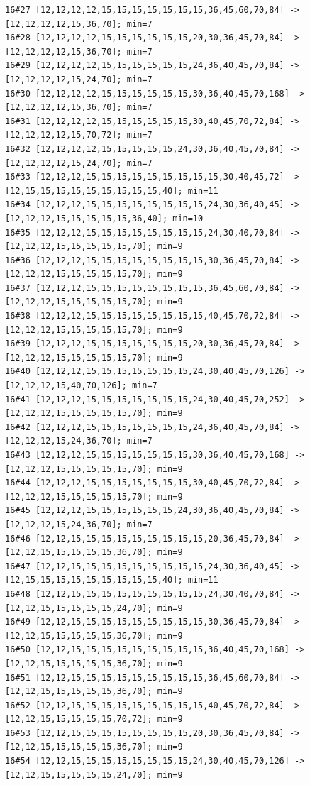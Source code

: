 \documentclass[11pt,a4paper]{article}
\begin{document}
\begin{Verbatim}[breaklines,breakanywhere,fontsize=\footnotesize]
16#27 [12,12,12,12,15,15,15,15,15,15,15,36,45,60,70,84] -> [12,12,12,12,15,36,70]; min=7
16#28 [12,12,12,12,15,15,15,15,15,15,20,30,36,45,70,84] -> [12,12,12,12,15,36,70]; min=7
16#29 [12,12,12,12,15,15,15,15,15,15,24,36,40,45,70,84] -> [12,12,12,12,15,24,70]; min=7
16#30 [12,12,12,12,15,15,15,15,15,15,30,36,40,45,70,168] -> [12,12,12,12,15,36,70]; min=7
16#31 [12,12,12,12,15,15,15,15,15,15,30,40,45,70,72,84] -> [12,12,12,12,15,70,72]; min=7
16#32 [12,12,12,12,15,15,15,15,15,24,30,36,40,45,70,84] -> [12,12,12,12,15,24,70]; min=7
16#33 [12,12,12,15,15,15,15,15,15,15,15,15,30,40,45,72] -> [12,15,15,15,15,15,15,15,15,15,40]; min=11
16#34 [12,12,12,15,15,15,15,15,15,15,15,24,30,36,40,45] -> [12,12,12,15,15,15,15,15,36,40]; min=10
16#35 [12,12,12,15,15,15,15,15,15,15,15,24,30,40,70,84] -> [12,12,12,15,15,15,15,15,70]; min=9
16#36 [12,12,12,15,15,15,15,15,15,15,15,30,36,45,70,84] -> [12,12,12,15,15,15,15,15,70]; min=9
16#37 [12,12,12,15,15,15,15,15,15,15,15,36,45,60,70,84] -> [12,12,12,15,15,15,15,15,70]; min=9
16#38 [12,12,12,15,15,15,15,15,15,15,15,40,45,70,72,84] -> [12,12,12,15,15,15,15,15,70]; min=9
16#39 [12,12,12,15,15,15,15,15,15,15,20,30,36,45,70,84] -> [12,12,12,15,15,15,15,15,70]; min=9
16#40 [12,12,12,15,15,15,15,15,15,15,24,30,40,45,70,126] -> [12,12,12,15,40,70,126]; min=7
16#41 [12,12,12,15,15,15,15,15,15,15,24,30,40,45,70,252] -> [12,12,12,15,15,15,15,15,70]; min=9
16#42 [12,12,12,15,15,15,15,15,15,15,24,36,40,45,70,84] -> [12,12,12,15,24,36,70]; min=7
16#43 [12,12,12,15,15,15,15,15,15,15,30,36,40,45,70,168] -> [12,12,12,15,15,15,15,15,70]; min=9
16#44 [12,12,12,15,15,15,15,15,15,15,30,40,45,70,72,84] -> [12,12,12,15,15,15,15,15,70]; min=9
16#45 [12,12,12,15,15,15,15,15,15,24,30,36,40,45,70,84] -> [12,12,12,15,24,36,70]; min=7
16#46 [12,12,15,15,15,15,15,15,15,15,15,20,36,45,70,84] -> [12,12,15,15,15,15,15,36,70]; min=9
16#47 [12,12,15,15,15,15,15,15,15,15,15,24,30,36,40,45] -> [12,15,15,15,15,15,15,15,15,15,40]; min=11
16#48 [12,12,15,15,15,15,15,15,15,15,15,24,30,40,70,84] -> [12,12,15,15,15,15,15,24,70]; min=9
16#49 [12,12,15,15,15,15,15,15,15,15,15,30,36,45,70,84] -> [12,12,15,15,15,15,15,36,70]; min=9
16#50 [12,12,15,15,15,15,15,15,15,15,15,36,40,45,70,168] -> [12,12,15,15,15,15,15,36,70]; min=9
16#51 [12,12,15,15,15,15,15,15,15,15,15,36,45,60,70,84] -> [12,12,15,15,15,15,15,36,70]; min=9
16#52 [12,12,15,15,15,15,15,15,15,15,15,40,45,70,72,84] -> [12,12,15,15,15,15,15,70,72]; min=9
16#53 [12,12,15,15,15,15,15,15,15,15,20,30,36,45,70,84] -> [12,12,15,15,15,15,15,36,70]; min=9
16#54 [12,12,15,15,15,15,15,15,15,15,24,30,40,45,70,126] -> [12,12,15,15,15,15,15,24,70]; min=9

\end{Verbatim}
\end{document}

